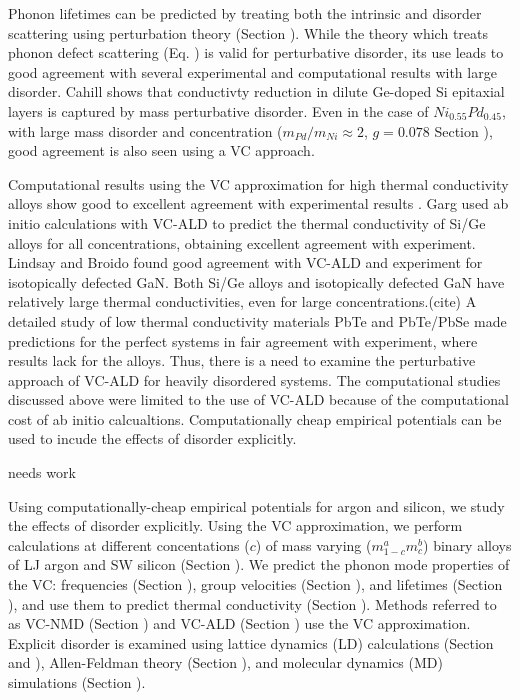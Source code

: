 \documentclass[aps,prb,onecolumn,preprint,superscriptaddress,amsmath,amssymb,floatfix]{revtex4}
\begin{document}
Phonon lifetimes can be predicted by treating both the intrinsic 
and disorder scattering using perturbation theory (Section ). 
While the theory which treats phonon defect scattering (Eq. ) 
is valid for
perturbative disorder, its use leads to good agreement with
several experimental and computational results with large disorder.  
Cahill shows that conductivty reduction in dilute 
Ge-doped Si epitaxial layers 
is captured by mass perturbative disorder.
\cite{cahill_thermal_2004,cahill_thermal_2005} 
Even in the
case of $Ni_{0.55}Pd_{0.45}$, with large mass disorder and 
concentration ($m_{Pd}/m_{Ni} \approx 2$, $g=0.078$ Section ), 
good agreement is also seen using a VC approach.
\cite{kamitakahara_vibrations_1974}

Computational results using the VC approximation 
for high thermal conductivity 
alloys show good to excellent agreement with experimental results
\cite{garg_role_2011,lindsay_thermal_2012}.
Garg used ab initio calculations with VC-ALD   
to predict the thermal conductivity of Si/Ge alloys 
for all concentrations, obtaining excellent agreement with experiment.
\cite{garg_role_2011}  Lindsay and Broido 
found good agreement with VC-ALD and experiment for 
isotopically defected GaN.\cite{lindsay_thermal_2012}  
Both Si/Ge alloys and isotopically defected GaN have relatively large 
thermal conductivities, even for large concentrations.(cite) 
A detailed study of low thermal conductivity materials 
PbTe\cite{shiga_microscopic_2012} and PbTe/PbSe\cite{tian_phonon_2012} 
made predictions for the perfect systems in fair agreement with 
experiment, where results lack for the alloys. 
Thus, there is a need to examine the perturbative approach of 
VC-ALD for heavily disordered systems. 
The computational studies discussed above were limited to the use 
of VC-ALD because of the computational cost of ab initio calcualtions. 
Computationally cheap empirical potentials can be used to incude 
the effects of disorder explicitly.

needs work 

Using computationally-cheap empirical potentials for argon 
and silicon\cite{stillinger_computer_1985},  
we study the effects of disorder explicitly. 
Using the VC approximation, 
we perform calculations at different concentations ($c$) 
of mass varying ($m^a_{1-c}m^b_{c}$) binary alloys of LJ argon 
and SW silicon (Section ). We predict 
the phonon mode properties of the VC:  
frequencies (Section ), group velocities (Section ),  
and lifetimes (Section ), and use them to predict thermal
conductivity (Section ). Methods referred to as VC-NMD (Section )
and VC-ALD (Section ) use the VC approximation. Explicit disorder 
is examined using lattice dynamics (LD) calculations 
(Section and ), Allen-Feldman theory (Section ),\cite{allen_thermal_1993} 
and molecular dynamics (MD) simulations 
(Section ). 
\end{document}
